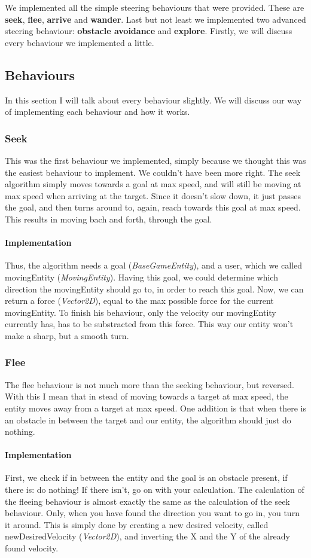 We implemented all the simple steering behaviours that were provided.
These are \textbf{seek}, \textbf{flee}, \textbf{arrive} and \textbf{wander}.
Last but not least we implemented two advanced steering behaviour: \textbf{obstacle avoidance} and \textbf{explore}.
Firstly, we will discuss every behaviour we implemented a little.
\subsection[Describing the steering behaviours]{Behaviours}\label{subsec:behaviours}
In this section I will talk about every behaviour slightly.
We will discuss our way of implementing each behaviour and how it works.
\subsubsection{Seek}
This was the first behaviour we implemented, simply because we thought this was the easiest behaviour to implement.
We couldn't have been more right.
The seek algorithm simply moves towards a goal at max speed, and will still be moving at max speed when arriving at the target.
Since it doesn't slow down, it just passes the goal, and then turns around to, again, reach towards this goal at max speed.
This results in moving bach and forth, through the goal.
\paragraph{Implementation}
Thus, the algorithm needs a goal (\textit{BaseGameEntity}), and a user, which we called movingEntity (\textit{MovingEntity}).
Having this goal, we could determine which direction the movingEntity should go to, in order to reach this goal.
Now, we can return a force (\textit{Vector2D}), equal to the max possible force for the current movingEntity.
To finish his behaviour, only the velocity our movingEntity currently has, has to be substracted from this force.
This way our entity won't make a sharp, but a smooth turn.
\subsubsection{Flee}
The flee behaviour is not much more than the seeking behaviour, but reversed.
With this I mean that in stead of moving towards a target at max speed, the entity moves away from a target at max speed.
One addition is that when there is an obstacle in between the target and our entity, the algorithm should just do nothing.
\paragraph{Implementation}
First, we check if in between the entity and the goal is an obstacle present, if there is: do nothing!
If there isn't, go on with your calculation.
The calculation of the fleeing behaviour is almost exactly the same as the calculation of the seek behaviour.
Only, when you have found the direction you want to go in, you turn it around.
This is simply done by creating a new desired velocity, called newDesiredVelocity (\textit{Vector2D}), and inverting the X and the Y of the already found velocity.
